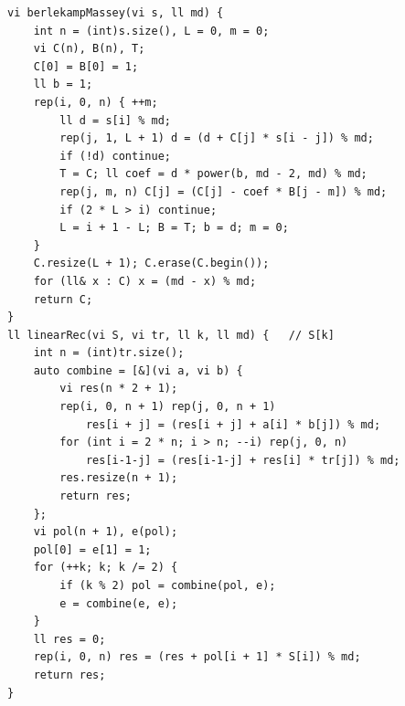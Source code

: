 \begin{lstlisting}
vi berlekampMassey(vi s, ll md) {
    int n = (int)s.size(), L = 0, m = 0;
    vi C(n), B(n), T;
    C[0] = B[0] = 1;
    ll b = 1;
    rep(i, 0, n) { ++m;
        ll d = s[i] % md;
        rep(j, 1, L + 1) d = (d + C[j] * s[i - j]) % md;
        if (!d) continue;
        T = C; ll coef = d * power(b, md - 2, md) % md;
        rep(j, m, n) C[j] = (C[j] - coef * B[j - m]) % md;
        if (2 * L > i) continue;
        L = i + 1 - L; B = T; b = d; m = 0;
    }
    C.resize(L + 1); C.erase(C.begin());
    for (ll& x : C) x = (md - x) % md;
    return C;
}
ll linearRec(vi S, vi tr, ll k, ll md) {   // S[k]
    int n = (int)tr.size();
    auto combine = [&](vi a, vi b) {
        vi res(n * 2 + 1);
        rep(i, 0, n + 1) rep(j, 0, n + 1)
            res[i + j] = (res[i + j] + a[i] * b[j]) % md;
        for (int i = 2 * n; i > n; --i) rep(j, 0, n)
            res[i-1-j] = (res[i-1-j] + res[i] * tr[j]) % md;
        res.resize(n + 1);
        return res;
    };
    vi pol(n + 1), e(pol);
    pol[0] = e[1] = 1;
    for (++k; k; k /= 2) {
        if (k % 2) pol = combine(pol, e);
        e = combine(e, e);
    }
    ll res = 0;
    rep(i, 0, n) res = (res + pol[i + 1] * S[i]) % md;
    return res;
}
\end{lstlisting}
